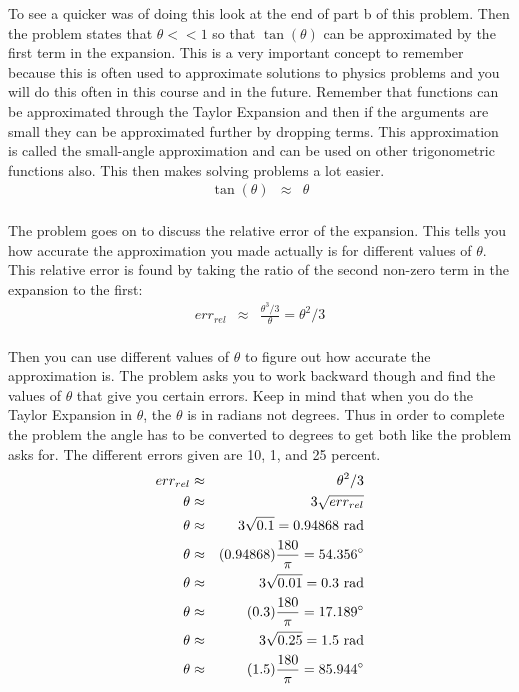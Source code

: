 \documentclass[11pt]{amsart}
\begin{document}
To see a quicker was of doing this look at the end of part b of this problem. Then the problem states that $\theta<<1$  so that $\tan(\theta)$ can be approximated by the first term in the expansion. This is a very important concept to remember because this is often used to approximate solutions to physics problems and you will do this often in this course and in the future. Remember that functions can be approximated through the Taylor Expansion and then if the arguments are small they can be approximated further by dropping terms. This approximation is called the small-angle approximation and can be used on other trigonometric functions also. This then makes solving problems a lot easier. \\
\begin{eqnarray}
\tan(\theta) &\approx& \theta \nonumber
\end{eqnarray} \\
The problem goes on to discuss the relative error of the expansion. This tells you how accurate the approximation you made actually is for different values of $\theta$. This relative error is found by taking the ratio of the second non-zero term in the expansion to the first: \\
\begin{eqnarray} 
err_{rel} &\approx& \frac{\theta^{3}/3}{\theta}  = \theta^{2}/3 \nonumber
\end{eqnarray} \\
Then you can use different values of $\theta$ to figure out how accurate the approximation is. The problem asks you to work backward though and find the values of $\theta$ that give you certain errors. Keep in mind that when you do the Taylor Expansion in $\theta$, the $\theta$ is in radians not degrees. Thus in order to complete the problem the angle has to be converted to degrees to get both like the problem asks for. The different errors given are 10, 1, and 25 percent. \\
\begin{eqnarray}
err_{rel} &\approx& \theta^{2}/3 \nonumber \\
\theta &\approx& 3\sqrt{err_{rel}} \nonumber \\
\theta &\approx& 3\sqrt{0.1} = 0.94868 \mbox{ rad} \nonumber \\
\theta &\approx& (0.94868)\frac{180}{\pi} = 54.356\degree \nonumber \\
\theta &\approx& 3\sqrt{0.01} = 0.3 \mbox{ rad} \nonumber \\
\theta &\approx& (0.3)\frac{180}{\pi} = 17.189\degree \nonumber \\
\theta &\approx& 3\sqrt{0.25} = 1.5 \mbox{ rad} \nonumber \\
\theta &\approx& (1.5)\frac{180}{\pi} = 85.944\degree \nonumber 
\end{eqnarray} \\ 
\end{document}
